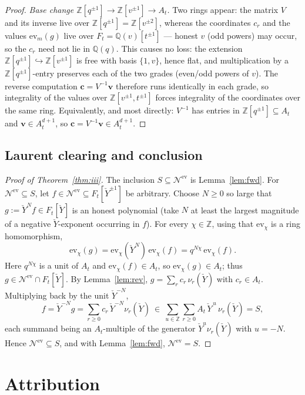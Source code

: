 \documentclass[11pt]{article}
\newcommand{\At}{A_t}
\newcommand{\Ft}{F_t}
\newcommand{\Nev}{\mathcal N^{\mathrm{ev}}}
\newcommand{\Yc}{\check Y}
\newcommand{\Z}{\mathbb Z}
\newcommand{\ev}{\mathrm{ev}}
\begin{document}
\begin{proof}
\smallskip
\emph{Base change $\Z[q^{\pm1}]\to\Z[v^{\pm1}]\to\At$.}\;
Two rings appear: the matrix $V$ and its inverse live over
$\Z[q^{\pm1}]=\Z[v^{\pm2}]$, whereas the coordinates $c_r$ and the values
$\ev_m(g)$ live over $\Ft=\mathbb Q(v)[t^{\pm1}]$ --- honest $v$ (odd powers) may
occur, so the $c_r$ need not lie in $\mathbb Q(q)$. This causes no loss: the
extension $\Z[q^{\pm1}]\hookrightarrow\Z[v^{\pm1}]$ is free with basis
$\{1,v\}$, hence flat, and multiplication by a $\Z[q^{\pm1}]$-entry preserves
each of the two grades (even/odd powers of $v$). The reverse computation
$\mathbf c=V^{-1}\mathbf v$ therefore runs identically in each grade, so
integrality of the values over $\Z[v^{\pm1},t^{\pm1}]$ forces integrality of the
coordinates over the same ring. Equivalently, and most directly:
$V^{-1}$ has entries in $\Z[q^{\pm1}]\subseteq\At$ and $\mathbf v\in\At^{d+1}$,
so $\mathbf c=V^{-1}\mathbf v\in\At^{d+1}$.
\end{proof}

\subsection{Laurent clearing and conclusion}

\begin{proof}[Proof of Theorem~\ref{thm:iii}]
The inclusion $S\subseteq\Nev$ is Lemma~\ref{lem:fwd}. For $\Nev\subseteq S$,
let $f\in\Nev\subseteq\Ft[\Yc^{\pm1}]$ be arbitrary. Choose $N\ge0$ so large that
$g:=\Yc^{N}f\in\Ft[\Yc]$ is an honest polynomial (take $N$ at least the largest
magnitude of a negative $\Yc$-exponent occurring in $f$). For every $\chi\in\Z$,
using that $\ev_\chi$ is a ring homomorphism,
\[
  \ev_\chi(g)=\ev_\chi(\Yc^{N})\,\ev_\chi(f)=q^{N\chi}\,\ev_\chi(f).
\]
Here $q^{N\chi}$ is a unit of $\At$ and $\ev_\chi(f)\in\At$, so
$\ev_\chi(g)\in\At$; thus $g\in\Nev\cap\Ft[\Yc]$. By Lemma~\ref{lem:rev},
$g=\sum_{r}c_r\,\nu_r(\Yc)$ with $c_r\in\At$. Multiplying back by the unit
$\Yc^{-N}$,
\[
  f=\Yc^{-N}g=\sum_{r\ge0}c_r\,\Yc^{-N}\nu_r(\Yc)
   \ \in\ \sum_{u\in\Z}\sum_{r\ge0}\At\,\Yc^{\,u}\,\nu_r(\Yc)=S,
\]
each summand being an $\At$-multiple of the generator $\Yc^{u}\nu_r(\Yc)$ with
$u=-N$. Hence $\Nev\subseteq S$, and with Lemma~\ref{lem:fwd}, $\Nev=S$.
\end{proof}

\section{Attribution}
\end{document}
